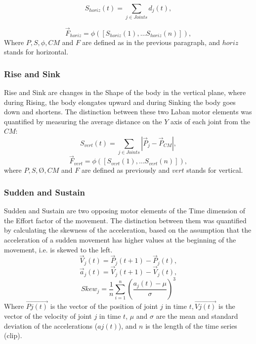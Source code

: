 \begin{equation}
S_{horiz}(t) = \sum_{j \in Joints} d_{j}(t),
\end{equation}

\begin{equation}
\vec{F}_{horiz} = \phi([S_{horiz}(1), \ldots S_{horiz}(n)]),
\end{equation}
Where $P, S, \phi, CM$ and $F$ are defined as in the previous paragraph, and
$horiz$ stands for horizontal.
\subsubsection{Rise and Sink}
Rise and Sink are changes in the Shape of the body in the vertical plane, where
during Rising, the body elongates upward and during Sinking the body goes down
and shortens. The distinction between these two Laban motor elements was
quantified by measuring the average distance on the $Y$ axis of each joint from
the $CM$:
\begin{equation}
S_{vert}(t) = \sum_{j \in Joints}
\left|\vec{P}_{j}-\vec{P}_{CM}\right|,
\end{equation}
\begin{equation}
\vec{F}_{vert} = \phi([S_{vert}(1), \ldots S_{vert}(n)]),
\end{equation}
where $P, S, Ø, CM$ and $F$ are defined as previously and $vert$ stands for
vertical.
\subsubsection{Sudden and Sustain}
Sudden and Sustain are two opposing motor elements of the Time dimension of the
Effort factor of the movement.  The distinction between them was quantified by
calculating the skewness of the acceleration, based on the assumption that the
acceleration of a sudden movement has higher values at the beginning of the
movement, i.e. is skewed to the left.
\begin{equation}
\vec{V}_{j}(t) = \vec{P}_{j}(t+1) - \vec{P}_{j}(t),
\end{equation}
\begin{equation}
\vec{a}_j(t) = \vec{V}_{j}(t+1) - \vec{V}_{j}(t),
\end{equation}
\begin{equation}
Skew_j = \frac{1}{n}\sum_{i=1}^{n}(\frac{a_j(t) - \mu}{\sigma})^3
\end{equation}
Where $\vec{Pj(t)}$ is the vector of the position of joint $j$ in time $t,
\vec{Vj(t)}$ is the vector of the velocity of joint $j$  in time $t$, $\mu$ and
$\sigma$ are the mean and standard deviation of the accelerations ($aj(t)$), and
$n$ is the length of the time series (clip). 
